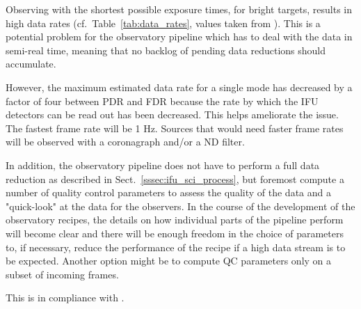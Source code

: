 Observing with the shortest possible exposure times, for bright targets,
results in high data rates (cf.~Table~\ref{tab:data_rates}, values taken from
\cite{METIS-data_rates}). This is a potential problem for the observatory
pipeline which has to deal with the data in semi-real time, meaning that no
backlog of pending data reductions should accumulate.

However, the maximum estimated data rate for a single mode has decreased by a
factor of four between PDR and FDR because the rate by which the IFU detectors
can be read out has been decreased. This helps ameliorate the issue. 
The fastest frame rate will be 1 Hz.
Sources that would need faster frame rates will be observed with a coronagraph and/or a ND filter.

In addition, the observatory pipeline does not have to perform a full data reduction
as described in Sect.~\ref{sssec:ifu_sci_process}, but foremost compute a number
of quality control parameters to assess the quality of the data and a
"quick-look" at the data for the observers. In the course of the development of
the observatory recipes, the details on how individual parts of the pipeline
perform will become clear and there will be enough freedom in the choice of
parameters to, if necessary, reduce the performance of the recipe if a high data
stream is to be expected. Another option might be to compute QC parameters only
on a subset of incoming frames.


This is in compliance with .



